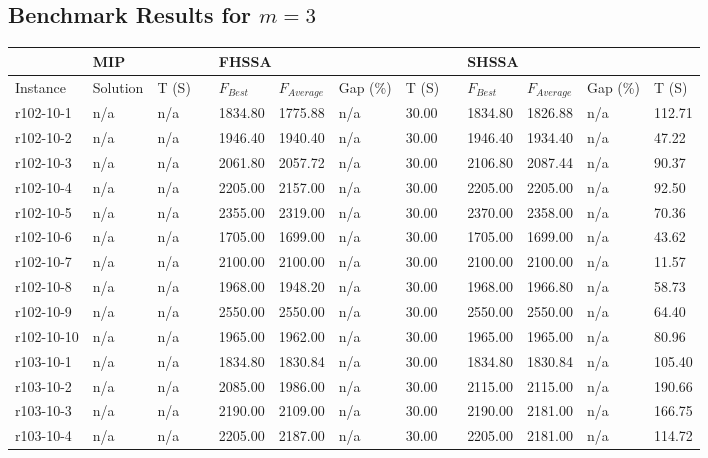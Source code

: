 \documentclass[final,5p,times,twocolumn]{elsarticle}
\begin{document}
{{{{{{{{{{{{{%
\subsection{Benchmark Results for $m=3$}
\begin{longtable}{l l l l l l l l l l l l l}
\hline
& \multicolumn{2}{l}{MIP}&&\multicolumn{4}{l}{FHSSA}&& \multicolumn{4}{l}{SHSSA}\\
\hline
Instance & Solution & T (S) & & $F_{Best}$ & $F_{Average}$  & Gap (\%) & T (S) & & $F_{Best}$ & $F_{Average}$  & Gap (\%) & T (S)\\
\hline
\endhead
r102-10-1& n/a& n/a&&1834.80& 1775.88& n/a& 30.00&&1834.80& 1826.88& n/a& 112.71\\
r102-10-2& n/a& n/a&&1946.40& 1940.40& n/a& 30.00&&1946.40& 1934.40& n/a& 47.22\\
r102-10-3& n/a& n/a&&2061.80& 2057.72& n/a& 30.00&&2106.80& 2087.44& n/a& 90.37\\
r102-10-4& n/a& n/a&&2205.00& 2157.00& n/a& 30.00&&2205.00& 2205.00& n/a& 92.50\\
r102-10-5& n/a& n/a&&2355.00& 2319.00& n/a& 30.00&&2370.00& 2358.00& n/a& 70.36\\
r102-10-6& n/a& n/a&&1705.00& 1699.00& n/a& 30.00&&1705.00& 1699.00& n/a& 43.62\\
r102-10-7& n/a& n/a&&2100.00& 2100.00& n/a& 30.00&&2100.00& 2100.00& n/a& 11.57\\
r102-10-8& n/a& n/a&&1968.00& 1948.20& n/a& 30.00&&1968.00& 1966.80& n/a& 58.73\\
r102-10-9& n/a& n/a&&2550.00& 2550.00& n/a& 30.00&&2550.00& 2550.00& n/a& 64.40\\
r102-10-10& n/a& n/a&&1965.00& 1962.00& n/a& 30.00&&1965.00& 1965.00& n/a& 80.96\\
r103-10-1& n/a& n/a&&1834.80& 1830.84& n/a& 30.00&&1834.80& 1830.84& n/a& 105.40\\
r103-10-2& n/a& n/a&&2085.00& 1986.00& n/a& 30.00&&2115.00& 2115.00& n/a& 190.66\\
r103-10-3& n/a& n/a&&2190.00& 2109.00& n/a& 30.00&&2190.00& 2181.00& n/a& 166.75\\
r103-10-4& n/a& n/a&&2205.00& 2187.00& n/a& 30.00&&2205.00& 2181.00& n/a& 114.72\\

\end{longtable}}}}}}}}}}}}}}
\end{document}
